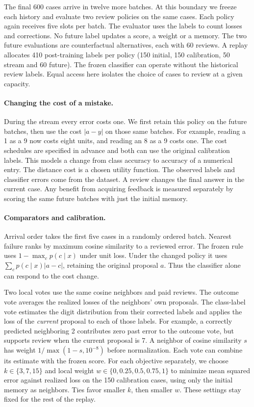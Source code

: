 The final 600 cases arrive in twelve more batches. At this boundary we freeze
each history and evaluate two review policies on the same cases. Each policy
again receives five slots per batch. The evaluator uses the labels to count
losses and corrections. No future label updates a score, a weight or a memory.
The two future evaluations are counterfactual alternatives, each with 60
reviews. A replay allocates 410 post-training labels per policy (150 initial,
150 calibration, 50 stream and 60 future). The frozen classifier can operate
without the historical review labels. Equal access here isolates the choice
of cases to review at a given capacity.

\paragraph{Changing the cost of a mistake.}
During the stream every error costs one. We first retain this policy on the
future batches, then use the cost $|a-y|$ on those same batches. For example,
reading a 1 as a 9 now costs eight units, and reading an 8 as a 9 costs one.
The cost schedules are specified in advance and both can use the original
calibration labels. This models a change from class accuracy to accuracy of a
numerical entry. The distance cost is a chosen utility function. The observed
labels and classifier errors come from the dataset. A review changes the final
answer in the current case. Any benefit from acquiring feedback is measured
separately by scoring the same future batches with just the initial memory.

\paragraph{Comparators and calibration.}
Arrival order takes the first five cases in a randomly ordered batch.
Nearest failure ranks by maximum cosine similarity to a reviewed error.
The frozen rule uses $1-\max_c p(c\mid x)$ under unit loss. Under the
changed policy it uses $\sum_c p(c\mid x)|a-c|$, retaining the original
proposal $a$. Thus the classifier alone can respond to the cost change.

Two local votes use the same cosine neighbors and paid reviews. The outcome
vote averages the realized losses of the neighbors' own proposals. The
class-label vote estimates the digit distribution from their corrected labels
and applies the loss of the \emph{current} proposal to each of those labels.
For example, a correctly predicted neighboring 2 contributes zero past
error to the outcome vote, but supports review when the current proposal
is 7. A neighbor of cosine similarity $s$ has weight
$1/\max(1-s,10^{-8})$ before normalization. Each vote can combine its
estimate with the frozen score. For each objective separately, we choose
$k\in\{3,7,15\}$ and local weight $w\in\{0,0.25,0.5,0.75,1\}$ to minimize
mean squared error against realized loss on the 150 calibration cases,
using only the initial memory as neighbors. Ties favor smaller $k$, then
smaller $w$. These settings stay fixed for the rest of the replay.

